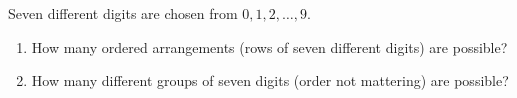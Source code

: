 Seven different digits are chosen from $0,1,2,\dots,9$.
\begin{enumerate}
\item[(a)] How many ordered arrangements (rows of seven different digits) are possible?
\item[(b)] How many different groups of seven digits (order not mattering) are possible?
\end{enumerate}
